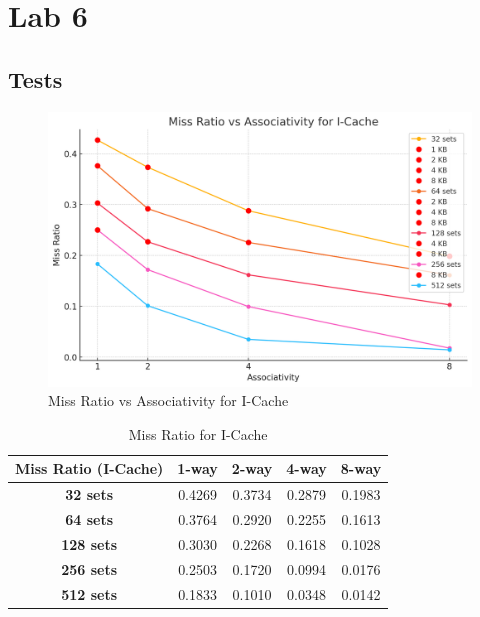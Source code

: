 \documentclass{article}
\begin{document}
\section{Lab 6}
\subsection{Tests}

\begin{figure}[H]
	\centering
	\includegraphics[width=\linewidth]{icache.png}
	\caption{Miss Ratio vs Associativity for I-Cache}
	\label{fig:icache}
\end{figure}
\begin{table}[h]
	\centering
	\begin{tabular}{|c|c|c|c|c|}
		\hline
		\textbf{Miss Ratio (I-Cache)} & \textbf{1-way} & \textbf{2-way} & \textbf{4-way} & \textbf{8-way} \\ \hline
		\textbf{32 sets}  &       0.4269      &       0.3734     &      0.2879       &       0.1983      \\ \hline
		\textbf{64 sets}  &        0.3764    &       0.2920     &       0.2255      &      0.1613      \\ \hline
		\textbf{128 sets} &       0.3030      &       0.2268     &        0.1618    &      0.1028       \\ \hline
		\textbf{256 sets} &        0.2503     &      0.1720       &      0.0994       &       0.0176      \\ \hline
		\textbf{512 sets} &       0.1833     &      0.1010      &       0.0348      &      0.0142      \\ \hline
	\end{tabular}
	\caption{Miss Ratio for I-Cache}
	\label{tab:I-Cache}
\end{table}
\end{document}
